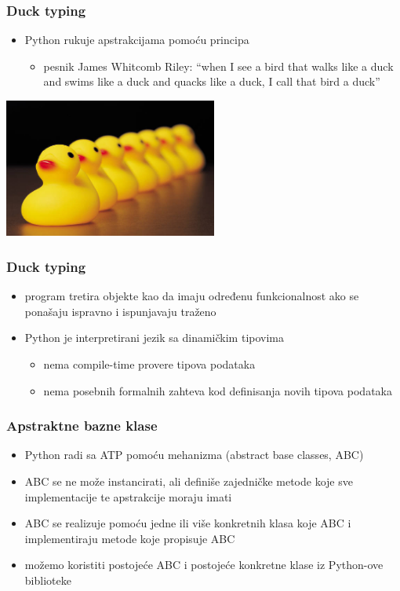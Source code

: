 \documentclass[compress,aspectratio=169]{beamer}
\begin{document}
\begin{frame}[fragile]
  \frametitle{Duck typing}
  \begin{itemize}
    \item Python rukuje apstrakcijama pomoću  principa
    \begin{itemize}
      \item pesnik James Whitcomb Riley: ``when I see a bird that walks like a duck and swims like a duck and quacks like a duck, I call that bird a duck''
    \end{itemize}
  \end{itemize}
  \begin{center}
    \includegraphics[width=7cm]{asp-03-pic02.png}
  \end{center}
\end{frame}

\begin{frame}[fragile]
  \frametitle{Duck typing}
  \begin{itemize}
    \item program tretira objekte kao da imaju određenu funkcionalnost ako se ponašaju ispravno i ispunjavaju traženo
    \item Python je interpretirani jezik sa dinamičkim tipovima
    \begin{itemize}
      \item nema compile-time provere tipova podataka
      \item nema posebnih formalnih zahteva kod definisanja novih tipova podataka
    \end{itemize}
  \end{itemize}
\end{frame}

\begin{frame}[fragile]
  \frametitle{Apstraktne bazne klase}
  \begin{itemize}
    \item Python radi sa ATP pomoću mehanizma  (abstract base classes, ABC)
    \item ABC se ne može instancirati, ali definiše zajedničke metode koje sve implementacije te apstrakcije moraju imati
    \item ABC se realizuje pomoću jedne ili više konkretnih klasa koje  ABC i implementiraju metode koje propisuje ABC
    \item možemo koristiti postojeće ABC i postojeće konkretne klase iz Python-ove biblioteke 
  \end{itemize}
\end{frame}
\end{document}
